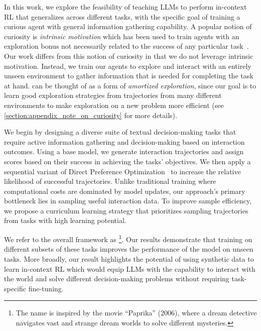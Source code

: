 In this work, we explore the feasibility of teaching LLMs to perform in-context RL that generalizes across different tasks, with the specific goal of training a curious agent with general information gathering capability. 
A popular notion of curiosity is \emph{intrinsic motivation} which has been used to train agents with an exploration bonus not necessarily related to the success of any particular task~\citep{schmidhuber1991curious, schmidhuber2007godel}. Our work differs from this notion of curiosity in that we do not leverage intrinsic motivation. Instead, we train our agents to explore and interact with an entirely unseen environment to gather information that is needed for completing the task at hand. \ours{} can be thought of as a form of \emph{amortized exploration}, since our goal is to learn good exploration strategies from trajectories from many different environments to make exploration on a new problem more efficient (see \cref{section:appendix_note_on_curiosity} for more details).

We begin by designing a diverse suite of textual decision-making tasks that require active information gathering and decision-making based on interaction outcomes.
Using a base model, we generate interaction trajectories and assign scores based on their success in achieving the tasks' objectives.
We then apply a sequential variant of Direct Preference Optimization~\citep[DPO]{rafailov2024direct} to increase the relative likelihood of successful trajectories.
Unlike traditional training where computational costs are dominated by model updates, our approach's primary bottleneck lies in sampling useful interaction data. To improve sample efficiency, we propose a curriculum learning strategy that prioritizes sampling trajectories from tasks with high learning potential.

We refer to the overall framework as \ours{}\footnote{The name is inspired by the movie ``Paprika'' (2006), where a dream detective navigates vast and strange dream worlds to solve different mysteries.}.
Our results demonstrate that training on different subsets of these tasks improves the performance of the model on unseen tasks. More broadly, our result highlights the potential of using synthetic data to learn in-context RL which would equip LLMs with the capability to interact with the world and solve different decision-making problems without requiring task-specific fine-tuning.

